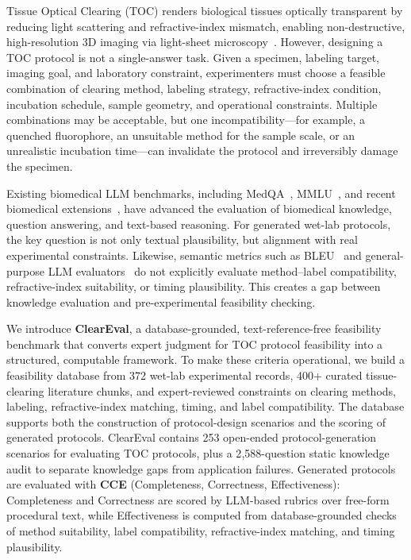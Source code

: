 \documentclass[conference]{IEEEtran}
\begin{document}
Tissue Optical Clearing (TOC) renders biological tissues optically transparent
by reducing light scattering and refractive-index mismatch, enabling
non-destructive, high-resolution 3D imaging via light-sheet
microscopy~\cite{ueda2020tissue,chung2013clarity}. However, designing a TOC
protocol is not a single-answer task. Given a specimen, labeling target,
imaging goal, and laboratory constraint, experimenters must choose a feasible
combination of clearing method, labeling strategy, refractive-index condition,
incubation schedule, sample geometry, and operational constraints. Multiple
combinations may be acceptable, but one incompatibility---for example, a
quenched fluorophore, an unsuitable method for the sample scale, or an
unrealistic incubation time---can invalidate the protocol and irreversibly
damage the specimen.

Existing biomedical LLM benchmarks, including MedQA~\cite{jin2021disease},
MMLU~\cite{hendrycks2021mmlu}, and recent biomedical
extensions~\cite{zhang2025benchmarking,wang2025cardbiomedbench,feng2024mediq},
have advanced the evaluation of biomedical knowledge, question answering, and
text-based reasoning. For generated wet-lab protocols, the key question is not only textual plausibility, but alignment with real experimental constraints. Likewise, semantic metrics such as
BLEU~\cite{papineni2002bleu} and general-purpose LLM
evaluators~\cite{liu2023geval,li2024survey} do not explicitly evaluate
method--label compatibility, refractive-index suitability, or timing
plausibility. This creates a gap between knowledge evaluation and
pre-experimental feasibility checking.

We introduce \textbf{ClearEval}, a database-grounded, text-reference-free
feasibility benchmark that converts expert judgment for TOC protocol feasibility
into a structured, computable framework. To make these criteria operational,
we build a feasibility database from 372 wet-lab experimental records,
400+ curated tissue-clearing literature chunks, and expert-reviewed constraints
on clearing methods, labeling, refractive-index matching, timing, and
label compatibility. The database supports both the construction of protocol-design
scenarios and the scoring of generated protocols. ClearEval contains 253
open-ended protocol-generation scenarios for evaluating TOC protocols, plus a
2{,}588-question static knowledge audit to separate knowledge gaps from
application failures. Generated protocols are evaluated with \textbf{CCE}
(Completeness, Correctness, Effectiveness): Completeness and Correctness are
scored by LLM-based rubrics over free-form procedural text, while Effectiveness
is computed from database-grounded checks of method suitability, label
compatibility, refractive-index matching, and timing plausibility.
\end{document}
